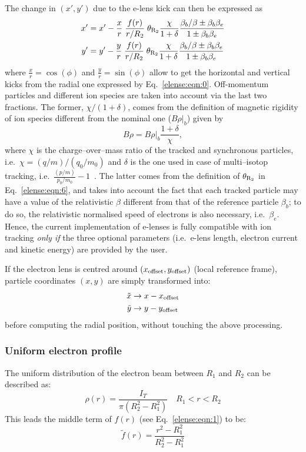 \documentclass[english]{article}
\begin{document}
The change in $(x',y')$ due to the e-lens kick can then be expressed as
\begin{align}
x'&=x'-\frac{x}{r}\;\frac{f(r)}{r/R_2}\;\theta_{\rm R_2}\frac{\chi}{1+\delta}\frac{\beta_b/\beta\pm\beta_b\beta_e}{1\pm\beta_b\beta_e}\label{elense:eqn:2}\\
y'&=y'-\frac{y}{r}\;\frac{f(r)}{r/R_2}\;\theta_{\rm R_2}\frac{\chi}{1+\delta}\frac{\beta_b/\beta\pm\beta_b\beta_e}{1\pm\beta_b\beta_e}\label{elense:eqn:3}
\end{align}
where $\frac{x}{r}=\cos(\phi)$ and $\frac{y}{r}=\sin(\phi)$ allow to get the
horizontal and vertical kicks from the radial one expressed by
Eq.~\ref{elense:eqn:0}.
Off-momentum particles and different ion species are taken into
account via the last two fractions. The former, $\chi/(1+\delta)$,
comes from the definition of magnetic rigidity of ion species different
from the nominal one ($B\rho|_b$) given by
\begin{equation}
  B\rho = B\rho|_b \frac{1+\delta}{\chi},
\end{equation}
where $\chi$ is the charge--over--mass ratio of the tracked and synchronous
particles, i.e.~$\chi=(q/m)/(q_0/m_0)$ and $\delta$ is the one used in case of
multi--isotop tracking, i.e.~$\frac{(p/m)}{p_0/m_0}-1$~\cite{Hermes:2241364}.
The latter comes from the definition of $\theta_{\rm R_2}$ in Eq.~\ref{elense:eqn:6},
and takes into account the fact that each tracked particle may have a value of
the relativistic $\beta$ different from that of the reference particle $\beta_b$;
to do so, the relativistic normalised speed of electrons is also necessary,
i.e.~$\beta_e$. Hence, the current implementation of e-lenses is fully compatible
with ion tracking \emph{only if} the three optional parameters (i.e.~e-lens length,
electron current and kinetic energy) are provided by the user.

If the electron lens is centred around $(x_{\rm offset},y_{\rm offset})$
(local reference frame), particle coordinates $(x,y)$ are simply transformed
into:
\begin{align}
\tilde x&\rightarrow x-x_{\rm offset}\\
\tilde y&\rightarrow y-y_{\rm offset}\\
\end{align}
before computing the radial position, without touching the above processing.

\subsubsection{Uniform electron profile}
The uniform distribution of the electron beam between $R_1$ and $R_2$
can be described as:
\begin{equation}
\rho(r) = \frac{I_T}{\pi (R_2^2 -R_1^2) } \quad R_1 < r < R_2
\end{equation}
This leads the middle term of $f(r)$ (see Eq.~\ref{elense:eqn:1}) to be:
\begin{equation}
\tilde f(r)=\frac{r^2-R_1^2}{R_2^2-R_1^2}
\end{equation}
\end{document}
